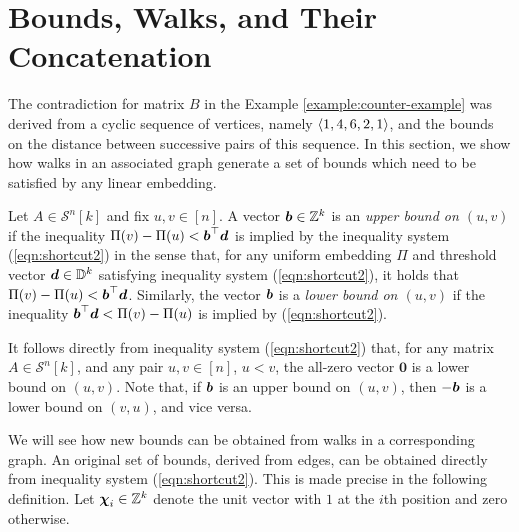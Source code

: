 \documentclass[runningheads]{llncs}
\begin{document}
 \section{Bounds, Walks, and Their Concatenation}\label{sec:Bounds and walks}

The contradiction for matrix $B$ in the Example \ref{example:counter-example} was derived from a cyclic sequence of vertices, namely $\path{1,4,6, 2,1}$, and the bounds on the distance between successive pairs of this sequence. In this section, we show how walks in an associated graph generate a set of bounds which need to be satisfied by any linear embedding.



\begin{definition}\label{def:bound}
Let $A\in\mathcal{S}^n[k]$ and fix $u,v\in[n]$.
A vector $\bmb\in\zz^k$ is an {\em upper bound on $(u,v)$} if 
the inequality $\dist uv < \bmb^\top\bmd$ is implied by the inequality system (\ref{eqn:shortcut2}) in the sense that, for any uniform embedding $\Pi$ and threshold vector $\bmd\in\bmD$ satisfying inequality system (\ref{eqn:shortcut2}), it holds that $\dist uv< \bmb^\top\bmd$.
Similarly, the vector  $\bmb$ is a {\em lower bound on $(u,v)$} if the inequality $\bmb^\top\bmd<\dist uv$ is implied by (\ref{eqn:shortcut2}). 

\end{definition}

It follows directly from inequality system (\ref{eqn:shortcut2}) that, for any matrix $A\in\mathcal{S}^n[k]$, and any pair $u,v\in[n]$, $ u<v$, the all-zero vector $\bm 0$ is a lower bound on $(u,v)$. %
Note that, if $\bmb$ is an upper bound on $(u,v)$, then $-\bmb$ is a lower bound on $(v,u)$, and vice versa.  



We will see how new bounds can be obtained from walks in a corresponding graph. 
An original set of bounds, derived from edges, can be obtained directly from inequality system (\ref{eqn:shortcut2}). This is made precise in the following definition.
Let $\bm\chi_i\in\zz^k$ denote the unit vector with $1$ at the $i$th position and zero otherwise.
\end{document}
